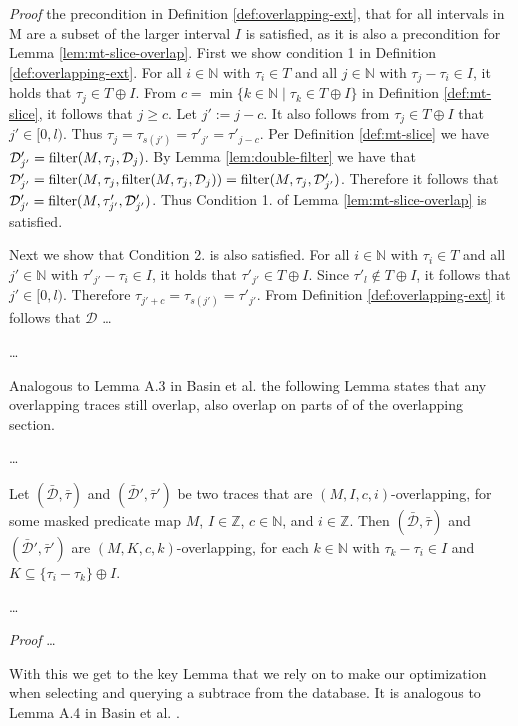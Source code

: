 \textit{Proof} the precondition in Definition \ref{def:overlapping-ext}, that for all intervals in M are a subset of the larger interval $I$ is satisfied, as it is also a precondition for Lemma \ref{lem:mt-slice-overlap}.
First we show condition 1 in Definition \ref{def:overlapping-ext}.
For all $i \in \mathbb{N}$ with $\tau_i \in T$ and all $j \in \mathbb{N}$ with $\tau_j - \tau_i \in I$, it holds that $\tau_j \in T \oplus I$.
From $c = \min\{k \in \mathbb{N} \mid \tau_k \in T \oplus I\}$ in Definition \ref{def:mt-slice}, it follows that $j \geq c$.
Let $j' := j-c$.
It also follows from $\tau_j \in T \oplus I$ that $j' \in [0,l)$.
Thus $\tau_j = \tau_{s(j')} = \tau'_{j'} = \tau'_{j - c}$.
Per Definition \ref{def:mt-slice} we have $\mathcal{D}'_{j'} = \operatorname{filter}(M, \tau_j, \mathcal{D}_j)$.
By Lemma \ref{lem:double-filter} we have that $\mathcal{D}'_{j'} = \operatorname{filter}(M, \tau_j, \operatorname{filter}(M, \tau_j, \mathcal{D}_j)) = \operatorname{filter}(M, \tau_j, \mathcal{D}'_{j'})$.
Therefore it follows that $\mathcal{D}'_{j'} = \operatorname{filter}(M, \tau'_{j'}, \mathcal{D}'_{j'})$.
Thus Condition 1. of Lemma \ref{lem:mt-slice-overlap} is satisfied.

Next we show that Condition 2. is also satisfied. For all $i \in \mathbb{N}$ with $\tau_i \in T$ and all $j' \in \mathbb{N}$ with $\tau'_{j'}-\tau_i \in I$, it holds that $\tau'_{j'} \in T \oplus I$. Since $\tau'_l \not\in T \oplus I$, it follows that $j' \in [0,l)$.
Therefore $\tau_{j'+c} = \tau_{s(j')} = \tau'_{j'}$.
From Definition \ref{def:overlapping-ext} it follows that $\mathcal{D}$ \dots

\dots


Analogous to Lemma A.3 in Basin et al. \cite{Basin2016} the following Lemma states that any overlapping traces still overlap, also overlap on parts of of the overlapping section.

\dots
\begin{lemma}
    \label{lem:eri-overlap-transitivity}
    Let $(\bar{\mathcal{D}}, \bar{\tau})$ and $(\bar{\mathcal{D}}', \bar{\tau}')$ be two traces that are $(M,I,c,i)$-overlapping, for some masked predicate map $M$, $I \in \mathbb{Z}$, $c \in \mathbb{N}$, and $i \in \mathbb{Z}$.
    Then $(\bar{\mathcal{D}}, \bar{\tau})$ and $(\bar{\mathcal{D}}', \bar{\tau}')$ are $(M, K, c, k)$-overlapping, for each $k \in \mathbb{N}$ with $\tau_k - \tau_i \in I$ and $K \subseteq \{ \tau_i - \tau_k \} \oplus I$.

    \dots
\end{lemma}
\textit{Proof} \dots

With this we get to the key Lemma that we rely on to make our optimization when selecting and querying a subtrace from the database.
It is analogous to Lemma A.4 in Basin et al. \cite{Basin2016}.

